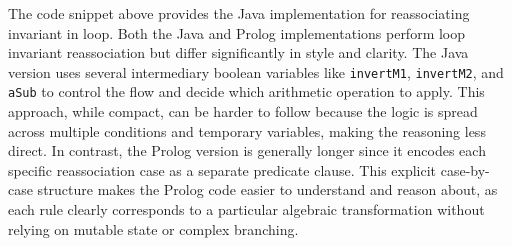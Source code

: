 The code snippet above provides the Java implementation for reassociating invariant in loop.
Both the Java and Prolog implementations perform loop invariant reassociation but differ significantly in style and clarity. The Java version uses several intermediary boolean variables like \texttt{invertM1}, \texttt{invertM2}, and \texttt{aSub} to control the flow and decide which arithmetic operation to apply. This approach, while compact, can be harder to follow because the logic is spread across multiple conditions and temporary variables, making the reasoning less direct. In contrast, the Prolog version is generally longer since it encodes each specific reassociation case as a separate predicate clause. This explicit case-by-case structure makes the Prolog code easier to understand and reason about, as each rule clearly corresponds to a particular algebraic transformation without relying on mutable state or complex branching.